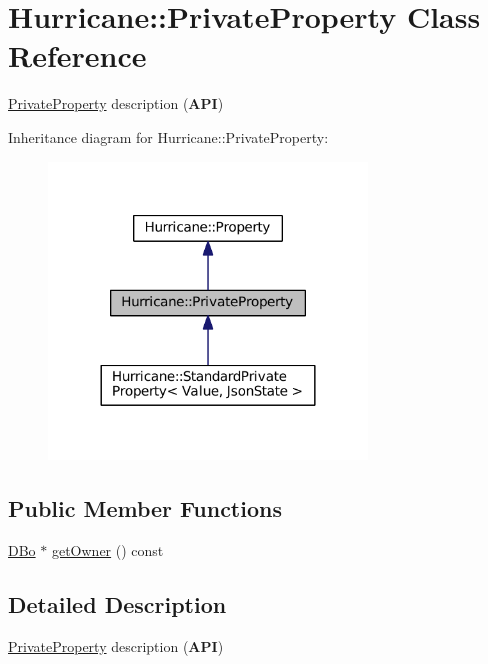 \hypertarget{classHurricane_1_1PrivateProperty}{}\section{Hurricane\+:\+:Private\+Property Class Reference}
\label{classHurricane_1_1PrivateProperty}


\mbox{\hyperlink{classHurricane_1_1PrivateProperty}{Private\+Property}} description ({\bfseries A\+PI})  




Inheritance diagram for Hurricane\+:\+:Private\+Property\+:\nopagebreak
\begin{figure}[H]
\begin{center}
\leavevmode
\includegraphics[width=240pt]{classHurricane_1_1PrivateProperty__inherit__graph}
\end{center}
\end{figure}
\subsection*{Public Member Functions}
\begin{DoxyCompactItemize}
\item 
\mbox{\hyperlink{classHurricane_1_1DBo}{D\+Bo}} $\ast$ \mbox{\hyperlink{classHurricane_1_1PrivateProperty_a070ea464f4859734163b12a134e2d8f2}{get\+Owner}} () const
\end{DoxyCompactItemize}


\subsection{Detailed Description}
\mbox{\hyperlink{classHurricane_1_1PrivateProperty}{Private\+Property}} description ({\bfseries A\+PI}) 

